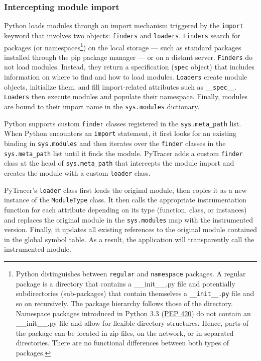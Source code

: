 \documentclass[10pt,journal,compsoc]{IEEEtran}
\newcommand{\pytracer}[0]{PyTracer\xspace}
\begin{document}
\subsubsection{Intercepting module import}

Python loads modules through an import mechanism triggered by the
\texttt{import} keyword that involves two objects: \texttt{finders} and
\texttt{loaders}. \texttt{Finders} search for packages (or
namespaces\footnote{Python distinguishes between \texttt{regular} and
    \texttt{namespace} packages. A regular package is a directory that contains a
    \_\_init\_\_.py file and potentially subdirectories (sub-packages) that contain
    themselves a \texttt{\_\_init\_\_.py} file and so on recursively. The package
    hierarchy follows those of the directory. Namespace packages introduced in
    Python 3.3 (\href{https://www.python.org/dev/peps/pep-0420/}{PEP 420}) do not
    contain an \_\_init\_\_.py file and allow for flexible directory structures.
    Hence, parts of the package can be located in zip files, on the network, or in
    separated directories. There are no functional differences between both types of
    packages.}) on the local storage --- such as standard packages installed through
the pip package manager --- or on a distant server. \texttt{Finders} do not load
modules. Instead, they return a specification (\texttt{spec} object) that
includes information on where to find and how to load modules. \texttt{Loaders}
create module objects, initialize them, and fill import-related attributes such
as \texttt{\_\_spec\_\_}. \texttt{Loaders} then execute modules and populate
their namespace. Finally, modules are bound to their import name in the
\texttt{sys.modules} dictionary.


Python supports custom \texttt{finder} classes registered in the
\texttt{sys.meta\_path} list. When Python encounters an \texttt{import}
statement, it first looks for an existing binding in \texttt{sys.modules} and
then iterates over the \texttt{finder} classes in the \texttt{sys.meta\_path}
list until it finds the module. \pytracer adds a custom \texttt{finder} class at
the head of \texttt{sys.meta\_path} that intercepts the module import and
creates the module with a custom \texttt{loader} class.

\pytracer's \texttt{loader} class first loads the original module, then copies
it as a new instance of the \texttt{ModuleType} class. It then calls the
appropriate instrumentation function for each attribute depending on its type
(function, class, or instances) and replaces the original module in the
\texttt{sys.modules} map with the instrumented version. Finally, it updates all
existing references to the original module contained in the global symbol table.
As a result, the application will transparently call the instrumented module.
\end{document}
